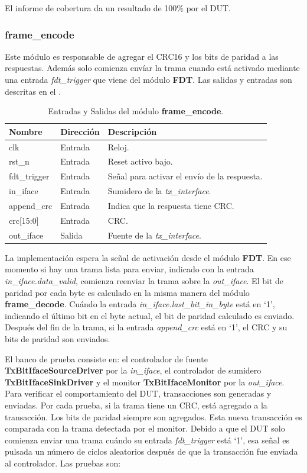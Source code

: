 \documentclass[a4paper, twoside, 11pt]{report}
\begin{document}
El informe de cobertura da un resultado de 100\% por el DUT.

\FloatBarrier
\subsubsection{frame\_encode}

Este módulo es responsable de agregar el CRC16 y los bits de paridad a las respuestas. Además solo comienza envíar la trama cuando está activado mediante una entrada \textit{fdt\_trigger} que viene del módulo \textbf{FDT}. Las salidas y entradas son descritas en el .

\begin{table}[htb]
  \centering
  \tablezebra
  \begin{tabulary}{\linewidth}{l|l|L}
    \setcounter{rownum}{0}
    \textbf{Nombre}&\textbf{Dirección}&\textbf{Descripción} \\
    \hline
    clk&Entrada&Reloj. \\
    rst\_n&Entrada&Reset activo bajo. \\
    fdt\_trigger&Entrada&Señal para activar el envío de la respuesta. \\
    in\_iface&Entrada&Sumidero de la \textit{tx\_interface}. \\
    append\_crc&Entrada&Indica que la respuesta tiene CRC. \\
    crc[15:0]&Entrada&CRC. \\
    out\_iface&Salida&Fuente de la \textit{tx\_interface}. \\
  \end{tabulary}
  \caption{Entradas y Salidas del módulo \textbf{frame\_encode}.}
  \label{tab:ports_frame_encode}
\end{table}

La implementación espera la señal de activación desde el módulo \textbf{FDT}. En ese momento si hay una trama lista para enviar, indicado con la entrada \textit{in\_iface.data\_valid}, comienza reenviar la trama sobre la \textit{out\_iface}. El bit de paridad por cada byte es calculado en la misma manera del módulo \textbf{frame\_decode}. Cuándo la entrada \textit{in\_iface.last\_bit\_in\_byte} está en ‘1’, indicando el último bit en el byte actual, el bit de paridad calculado es enviado. Después del fin de la trama, si la entrada \textit{append\_crc} está en ‘1’, el CRC y su bits de paridad son enviados.

El banco de prueba consiste en: el controlador de fuente \textbf{TxBitIfaceSourceDriver} por la \textit{in\_iface}, el controlador de sumidero \textbf{TxBitIfaceSinkDriver} y el monitor \textbf{TxBitIfaceMonitor} por la \textit{out\_iface}. Para verificar el comportamiento del DUT, transacciones son generadas y enviadas. Por cada prueba, si la trama tiene un CRC, está agregado a la transacción. Los bits de paridad siempre son agregados. Esta nueva transacción es comparada con la trama detectada por el monitor. Debido a que el DUT solo comienza enviar una trama cuándo su entrada \textit{fdt\_trigger} está ‘1’, esa señal es pulsada un número de ciclos aleatorios después de que la transacción fue enviada al controlador. Las pruebas son:
\end{document}
